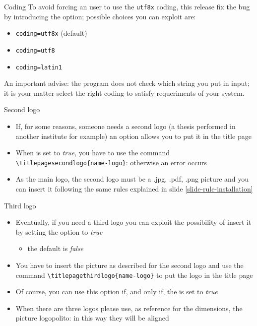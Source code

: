 \begin{frame}[t,fragile]{Coding}
To avoid forcing an user to use the \verb!utf8x! coding, this release fix the bug by introducing the  option; possible choices you can exploit are:
\begin{itemize}
\item \verb!coding=utf8x! (default)
\item \verb!coding=utf8! 
\item \verb!coding=latin1! 
\end{itemize}
An important advise: the program does not check which string you put in input; it is your matter select the right coding to satisfy requeriments of your system.
\end{frame}

\begin{frame}[t,fragile]{Second logo}
\begin{itemize}
\item If, for some reasons, someone needs a second logo (a thesis performed in another institute for example) an option allows you to put it in the title page
\item When  is set to \emph{true}, you have to use the command \verb!\titlepagesecondlogo{name-logo}!: otherwise an error occurs
\item As the main logo, the second logo must be a .jpg, .pdf, .png picture and you can insert it following the same rules explained in slide \ref{slide-rule-installation}
\end{itemize}
\end{frame}

\begin{frame}[fragile]{Third logo}
\begin{itemize}
\item Eventually, if you need a third logo you can exploit the possibility of insert it by setting the option  to \emph{true}
\begin{itemize}
\item the default is \emph{false}
\end{itemize}
\item You have to insert the picture as described for the second logo and use the command \verb!\titlepagethirdlogo{name-logo}!
to put the logo in the title page
\item Of course, you can use this option if, and only if, the  is set to \emph{true}
\item When there are three logos please use, as reference for the dimensions, the picture \alert{logopolito}: in this way they will be aligned
\end{itemize}
\end{frame}

